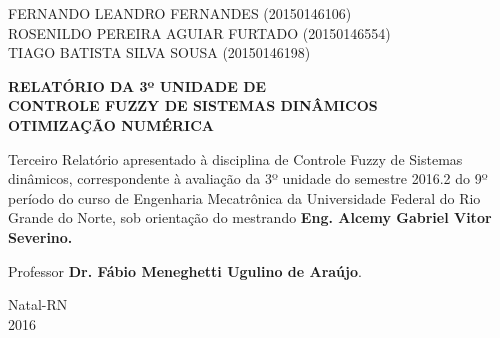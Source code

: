 \documentclass[a4paper,12pt]{article}
\begin{document}
\newpage


\thispagestyle{empty}

\begin{center}
\begin{normalsize}
FERNANDO LEANDRO FERNANDES (20150146106)\\
\vspace{0.8cm}
ROSENILDO PEREIRA AGUIAR FURTADO (20150146554)\\
\vspace{0.8cm}
TIAGO BATISTA SILVA SOUSA (20150146198)\\


\end{normalsize}
\end{center}
\vspace{6cm}

{\bf{\large {\centering RELATÓRIO DA 3º UNIDADE DE \\ CONTROLE FUZZY DE SISTEMAS DINÂMICOS\\
OTIMIZAÇÃO NUMÉRICA\\}}}

\vspace{2cm}

\begin{adjustwidth}{7.5cm}{0cm}

{\normalsize

Terceiro Relatório apresentado à disciplina de
Controle Fuzzy de Sistemas dinâmicos, correspondente à
avaliação da 3º unidade do semestre 2016.2 do 9º período
do curso de Engenharia Mecatrônica da
Universidade Federal do Rio Grande do Norte, sob
orientação do mestrando {\bf Eng. Alcemy Gabriel Vitor Severino.}

}

\end{adjustwidth}

\vspace{1.5cm}

\begin{center}

Professor {\bf Dr. Fábio Meneghetti Ugulino de Araújo}.

\vspace{3.5cm}

{\large Natal-RN\\
2016}

\end{center}

\newpage
\end{document}
